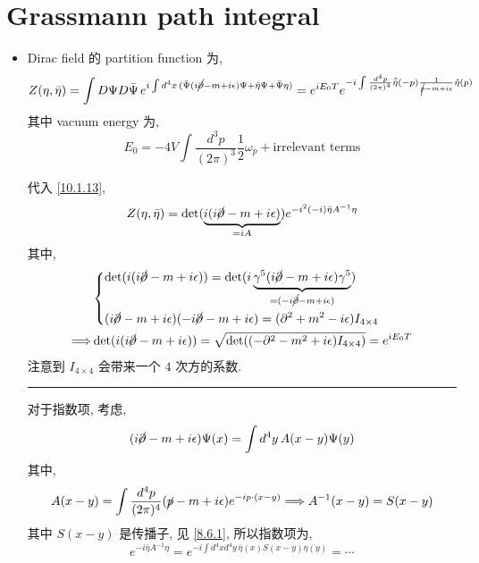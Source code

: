 \section{Grassmann path integral}
\begin{itemize}
	\item Dirac field 的 partition function 为,
	\begin{equation}
		Z(\eta, \bar{\eta}) = \int D\Psi D\bar{\Psi} \, e^{i \int d^4 x \, (\bar{\Psi} (i \cancel{\partial} - m + i \epsilon) \Psi + \bar{\eta} \Psi + \bar{\Psi} \eta)} = e^{i E_0 T} e^{- i \int \frac{d^4 p}{(2 \pi)^4} \tilde{\bar{\eta}}(- p) \frac{1}{\cancel{p} - m + i \epsilon} \tilde{\eta}(p)}
	\end{equation}
	其中 vacuum energy 为,
	\begin{equation}
		E_0 = - 4 V \int \frac{d^3 p}{(2 \pi)^3} \frac{1}{2} \omega_p + \text{irrelevant terms}
	\end{equation}
	
	\begin{tcolorbox}[title=calculation:]
		代入 \eqref{10.1.13},
		\begin{equation}
			Z(\eta, \bar{\eta}) = \det(\underbrace{i (i \cancel{\partial} - m + i \epsilon)}_{= i A}) e^{- i^2 (- i) \bar{\eta} A^{- 1} \eta}
		\end{equation}
		其中,
		\begin{align}
			& \begin{dcases}
				\det(i (i \cancel{\partial} - m + i \epsilon)) = \det(i \underbrace{\gamma^5 (i \cancel{\partial} - m + i \epsilon) \gamma^5}_{= (- i \cancel{\partial} - m + i \epsilon)}) \\
				(i \cancel{\partial} - m + i \epsilon) (- i \cancel{\partial} - m + i \epsilon) = (\partial^2 + m^2 - i \epsilon) I_{4 \times 4}
			\end{dcases} \notag \\
			\Longrightarrow & \det(i (i \cancel{\partial} - m + i \epsilon)) = \sqrt{\det((- \partial^2 - m^2 + i \epsilon) I_{4 \times 4})} = e^{i E_0 T}
		\end{align}
		注意到 $I_{4 \times 4}$ 会带来一个 $4$ 次方的系数.
		
		\noindent\rule[0.5ex]{\linewidth}{0.5pt} %
		
		对于指数项, 考虑,
		\begin{equation}
			(i \cancel{\partial} - m + i \epsilon) \Psi(x) = \int d^4 y \, A(x - y) \Psi(y)
		\end{equation}
		其中,
		\begin{equation}
			A(x - y) = \int \frac{d^4 p}{(2 \pi)^4} (\cancel{p} - m + i \epsilon) e^{- i p \cdot (x - y)} \Longrightarrow A^{- 1}(x - y) = S(x - y)
		\end{equation}
		其中 $S(x - y)$ 是传播子, 见 \eqref{8.6.1}, 所以指数项为,
		\begin{equation}
			e^{- i \bar{\eta} A^{- 1} \eta} = e^{- i \int d^4 x d^4 y \, \bar{\eta}(x) S(x - y) \eta(y)} = \cdots
		\end{equation}
	\end{tcolorbox}
\end{itemize}

